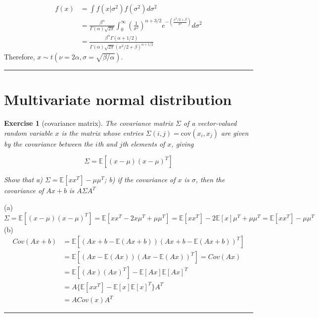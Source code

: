\documentclass[twoside]{article}
\newcounter{lecnum}
\newtheorem{exercise}{Exercise}[lecnum]
\newenvironment{proof}{{\bf Proof:}}{\hfill\rule{2mm}{2mm}}
\newcommand\E{\mathbb{E}}
\newcommand\cov{\mbox{cov}}
\begin{document}
\begin{proof}
\begin{equation}
\begin{split}
f(x) &= \int f(x|\sigma^2)f(\sigma^2)d\sigma^2\\
& =\frac{\beta^\alpha}{\Gamma(\alpha)\sqrt{2\pi}} \int _0^\infty (\frac{1}{\sigma^2})^{\alpha + 3/2}e^{-(\frac{x^2/2+ \beta}{\sigma^2})}d \sigma^2\\
& = \frac{\beta^\alpha\Gamma(\alpha +1/2)}{\Gamma(\alpha)\sqrt{2\pi}(x^2/2+ \beta)^{\alpha +1/2}}
\end{split}
\end{equation}
Therefore, $x \sim t(\nu=2\alpha, \sigma = \sqrt{\beta/\alpha})$.
\end{proof}



\section{Multivariate normal distribution}

\begin{exercise}[covariance matrix]
  The covariance matrix $\Sigma$ of a vector-valued random variable $x$ is the matrix whose entries $\Sigma(i,j) = \cov(x_i,x_j)$ are given by the covariance between the $i$th and $j$th elements of $x$, giving

  $$\Sigma = \E\left[(x-\mu)(x-\mu)^T\right]$$

  Show that a) $\Sigma = \E[xx^T] - \mu\mu^T$; b) if the covariance of $x$ is $\sigma$, then the covariance of $Ax+b$ is $A\Sigma A^T$
\end{exercise}

\begin{proof}
(a)$$\Sigma = \E\left[(x-\mu)(x-\mu)^T\right] = \E\left[xx^T-2x\mu^T+\mu\mu^T\right] =\E\left[xx^T\right] -2\E\left[x\right] \mu^T+ \mu\mu^T =  \E[xx^T] - \mu\mu^T$$
(b)
\begin{equation}
\begin{split}
Cov(Ax+b) &= \E\left[(Ax+b-\E(Ax+b))(Ax+b-\E(Ax+b))^T\right] \\
&= \E\left[(Ax-\E(Ax))(Ax-\E(Ax))^T\right] = Cov(Ax) \\
&= \E[(Ax)(Ax)^T] - \E[Ax]\E[Ax]^T\\
& = A\{\E[xx^T]-\E[x]\E[x]^T\}A^T\\
& = ACov(x)A^T
\end{split}
\end{equation}

\end{proof}
\end{document}
